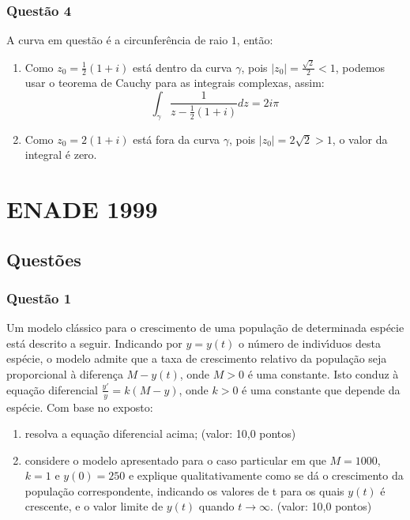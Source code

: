 \documentclass{report}
\begin{document}
\subsection{\color{red} Quest\~ao 4}

A curva em quest\~ao \'e a circunfer\^encia de raio $1$, ent\~ao:

\begin{enumerate}

\item[(a)] Como $z_0=\frac1{2}(1+i)$ est\'a dentro da curva $\gamma$, pois $|z_0|=\frac{\sqrt 2}{2}<1$, podemos usar o teorema de Cauchy para as integrais complexas, assim: $$\displaystyle \int_\gamma \frac1{z-\frac1{2}(1+i)} dz=2i\pi$$

\item[(b)] Como $z_0=2(1+i)$ est\'a fora da curva $\gamma$, pois $|z_0|=2\sqrt 2 > 1$, o valor da integral \'e zero.

\end{enumerate}

\chapter{ENADE 1999}

\section{\color{blue} Quest\~oes}

\subsection{\color{blue} Quest\~ao 1}

Um modelo cl\'assico para o crescimento de uma popula\c c\~ao de determinada esp\'ecie est\'a descrito a seguir. Indicando por
$y = y(t)$ o n\'umero de indiv\'\i duos desta esp\'ecie, o modelo admite que a taxa de crescimento relativo da popula\c c\~ao seja proporcional
\`a diferen\c ca $M - y(t)$, onde $M > 0$ \'e uma constante. Isto conduz \`a equa\c c\~ao diferencial $\displaystyle \frac{y'}{y}= k (M - y)$, onde $k > 0$ \'e uma constante que depende da esp\'ecie. Com base no exposto:

\begin{enumerate}

\item[(a)] resolva a equa\c c\~ao diferencial acima; (valor: 10,0 pontos)

\item[(b)] considere o modelo apresentado para o caso particular em que $M = 1000$, $k = 1$ e $y (0) = 250$ e explique qualitativamente como se d\'a o crescimento da popula\c c\~ao correspondente, indicando os valores de t para os quais $y(t)$ \'e crescente, e o valor limite de $y(t)$ quando $t \to \infty$. (valor: 10,0 pontos)

\end{enumerate}
\end{document}
